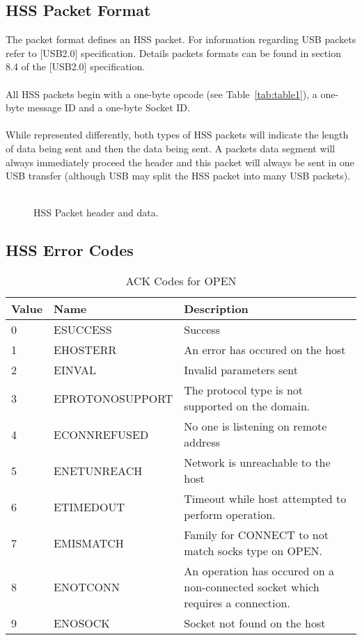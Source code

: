 \documentclass[10pt]{article}
\begin{document}
	\subsection{HSS Packet Format}
	The packet format defines an HSS packet. For information regarding USB packets refer to [USB2.0] specification. Details packets formats can be found in section 8.4 of the [USB2.0] specification. \\
	\\
	All HSS packets begin with a one-byte opcode (see Table~\ref{tab:table1}), a one-byte message ID and a one-byte Socket ID. \\
	\\
	While represented differently, both types of HSS packets will indicate the length of data being sent and then the data being sent. A packets data segment will always immediately proceed the header and this packet will always be sent in one USB transfer (although USB may split the HSS packet into many USB packets). \\
	\\
	\begin{figure}[H]
		\caption[HSS Packet header and data.]{HSS Packet header and data.}
			\centerline {
		} 
	\end{figure}
	\subsection{HSS Error Codes}
	\begin{table}[H]
		\begin{center}
			\caption{ACK Codes for OPEN}
			\label{tab:globalErrTable}
			\begin{tabular}{l|l|l} 
				\rowcolor{lightgray}
				\textbf{Value} &	\textbf{Name} & \textbf{Description}\\
				\hline
				0 & ESUCCESS & Success\\
				1 & EHOSTERR & An error has occured on the host\\
				2 & EINVAL & Invalid parameters sent\\
				3 & EPROTONOSUPPORT & The protocol type is not supported on the domain. \\
				4 & ECONNREFUSED & No one is listening on remote address\\
				5 & ENETUNREACH & Network is unreachable to the host\\
				6 & ETIMEDOUT & Timeout while host attempted to perform operation.\\
				7 & EMISMATCH & Family for CONNECT to not match socks type on OPEN.\\
				8 & ENOTCONN & An operation has occured on a non-connected socket which requires a connection.\\
				9 & ENOSOCK & Socket not found on the host \\
			\end{tabular}
		\end{center}
	\end{table} \mbox{}\\
\end{document}
